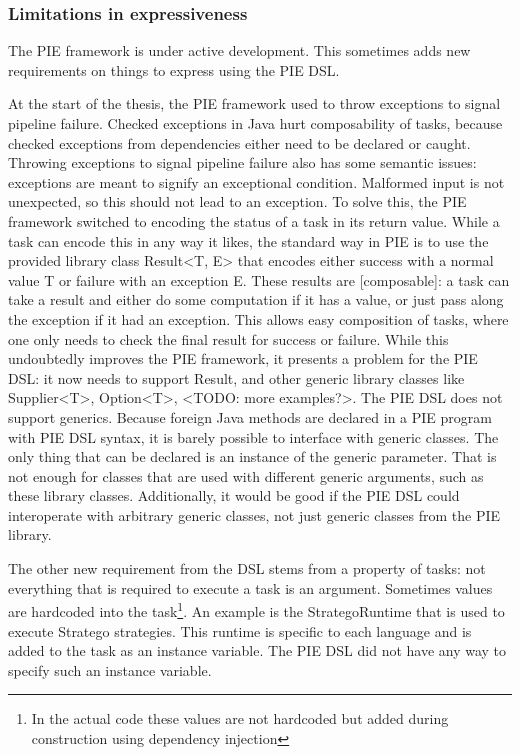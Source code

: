 \subsubsection{Limitations in expressiveness}
\label{subsubsec:problem_analysis__problems__expressiveness}

The \ac{PIE} framework is under active development.
This sometimes adds new requirements on things to express using the \ac{PIE} \ac{DSL}.

At the start of the thesis, the \ac{PIE} framework used to throw exceptions to signal pipeline failure.
Checked exceptions in Java hurt composability of tasks, because checked exceptions from dependencies either need to be declared or caught.
Throwing exceptions to signal pipeline failure also has some semantic issues: exceptions are meant to signify an exceptional condition.
Malformed input is not unexpected, so this should not lead to an exception.
To solve this, the \ac{PIE} framework switched to encoding the status of a task in its return value.
While a task can encode this in any way it likes, the standard way in \ac{PIE} is to use the provided library class Result<T, E> that encodes either success with a normal value T or failure with an exception E.
These results are [composable]: a task can take a result and either do some computation if it has a value, or just pass along the exception if it had an exception.
This allows easy composition of tasks, where one only needs to check the final result for success or failure.
While this undoubtedly improves the \ac{PIE} framework, it presents a problem for the \ac{PIE} \ac{DSL}: it now needs to support Result, and other generic library classes like Supplier<T>, Option<T>, <TODO: more examples?>.
The \ac{PIE} \ac{DSL} does not support generics.
Because foreign Java methods are declared in a \ac{PIE} program with \ac{PIE} \ac{DSL} syntax, it is barely possible to interface with generic classes.
The only thing that can be declared is an instance of the generic parameter. That is not enough for classes that are used with different generic arguments, such as these library classes.
Additionally, it would be good if the \ac{PIE} \ac{DSL} could interoperate with arbitrary generic classes, not just generic classes from the \ac{PIE} library.

The other new requirement from the \ac{DSL} stems from a property of tasks: not everything that is required to execute a task is an argument.
Sometimes values are hardcoded into the task\footnote{In the actual code these values are not hardcoded but added during  construction using dependency injection}.
An example is the StrategoRuntime that is used to execute Stratego strategies.
This runtime is specific to each language and is added to the task as an instance variable.
The \ac{PIE} \ac{DSL} did not have any way to specify such an instance variable.

